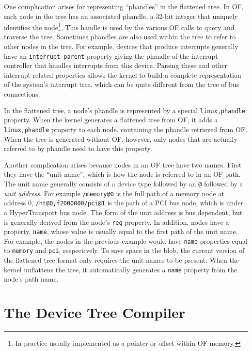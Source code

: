 \documentclass[a4paper,twocolumn]{article}
\newcommand{\tm}{\textsuperscript{\texttrademark}\xspace}
\newcommand{\phandle}{\texttt{linux,phandle}\xspace}
\begin{document}
One complication arises for representing ``phandles'' in the flattened
tree.  In OF, each node in the tree has an associated phandle, a
32-bit integer that uniquely identifies the node\footnote{In practice
usually implemented as a pointer or offset within OF memory.}.  This
handle is used by the various OF calls to query and traverse the tree.
Sometimes phandles are also used within the tree to refer to other
nodes in the tree.  For example, devices that produce interrupts
generally have an \texttt{interrupt-parent} property giving the
phandle of the interrupt controller that handles interrupts from this
device.  Parsing these and other interrupt related properties allows
the kernel to build a complete representation of the system's
interrupt tree, which can be quite different from the tree of bus
connections.

In the flattened tree, a node's phandle is represented by a special
\phandle property.  When the kernel generates a flattened tree from
OF, it adds a \phandle property to each node, containing the phandle
retrieved from OF.  When the tree is generated without OF, however,
only nodes that are actually referred to by phandle need to have this
property.

Another complication arises because nodes in an OF tree have two
names.  First they have the ``unit name'', which is how the node is
referred to in an OF path.  The unit name generally consists of a
device type followed by an \texttt{@} followed by a \emph{unit
address}.  For example \texttt{/memory@0} is the full path of a memory
node at address 0, \texttt{/ht@0,f2000000/pci@1} is the path of a PCI
bus node, which is under a HyperTransport\tm bus node.  The form of
the unit address is bus dependent, but is generally derived from the
node's \texttt{reg} property.  In addition, nodes have a property,
\texttt{name}, whose value is usually equal to the first path of the
unit name. For example, the nodes in the previous example would have
\texttt{name} properties equal to \texttt{memory} and \texttt{pci},
respectively.  To save space in the blob, the current version of the
flattened tree format only requires the unit names to be present.
When the kernel unflattens the tree, it automatically generates a
\texttt{name} property from the node's path name.

\section{The Device Tree Compiler}
\label{sec:dtc}
\end{document}

